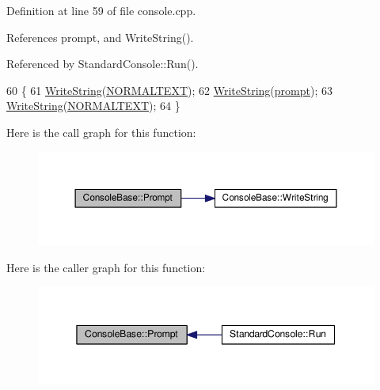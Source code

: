 Definition at line 59 of file console.\+cpp.



References prompt, and Write\+String().



Referenced by Standard\+Console\+::\+Run().


\begin{DoxyCode}
60 \{
61     \hyperlink{classConsoleBase_a839801eeb5c25cd0a2cb13523e387bed}{WriteString}(\hyperlink{platform_8h_abf175904907a69e0ce17289cdc282b59}{NORMALTEXT});
62     \hyperlink{classConsoleBase_a839801eeb5c25cd0a2cb13523e387bed}{WriteString}(\hyperlink{classConsoleBase_ac0b5764a1c339ac271d0c44943e4370c}{prompt});
63     \hyperlink{classConsoleBase_a839801eeb5c25cd0a2cb13523e387bed}{WriteString}(\hyperlink{platform_8h_abf175904907a69e0ce17289cdc282b59}{NORMALTEXT});
64 \}
\end{DoxyCode}


Here is the call graph for this function\+:\nopagebreak
\begin{figure}[H]
\begin{center}
\leavevmode
\includegraphics[width=350pt]{classConsoleBase_a79c5aa072ff3db35944a9825dcbfd9a7_cgraph}
\end{center}
\end{figure}




Here is the caller graph for this function\+:\nopagebreak
\begin{figure}[H]
\begin{center}
\leavevmode
\includegraphics[width=345pt]{classConsoleBase_a79c5aa072ff3db35944a9825dcbfd9a7_icgraph}
\end{center}
\end{figure}


